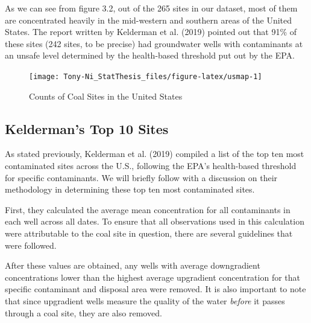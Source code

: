 \documentclass[12pt, twoside]{amherstthesis}
\begin{document}
As we can see from figure 3.2, out of the 265 sites in our dataset, most of them are concentrated heavily in the mid-western and southern areas of the United States. The report written by Kelderman et al. (2019) pointed out that 91\% of these sites (242 sites, to be precise) had groundwater wells with contaminants at an unsafe level determined by the health-based threshold put out by the EPA.
\begin{figure}

{\centering \texttt{[image: Tony-Ni\_StatThesis\_files/figure-latex/usmap-1]} 

}

\caption{Counts of Coal Sites in the United States}\label{fig:usmap}
\end{figure}
\hypertarget{keldermans-top-10-sites}{%
\subsection{Kelderman's Top 10 Sites}\label{keldermans-top-10-sites}}

As stated previously, Kelderman et al. (2019) compiled a list of the top ten most contaminated sites across the U.S., following the EPA's health-based threshold for specific contaminants. We will briefly follow with a discussion on their methodology in determining these top ten most contaminated sites.

First, they calculated the average mean concentration for all contaminants in each well across all dates. To ensure that all observations used in this calculation were attributable to the coal site in question, there are several guidelines that were followed.

After these values are obtained, any wells with average downgradient concentrations lower than the highest average upgradient concentration for that specific contaminant and disposal area were removed. It is also important to note that since upgradient wells measure the quality of the water \emph{before} it passes through a coal site, they are also removed.
\end{document}
